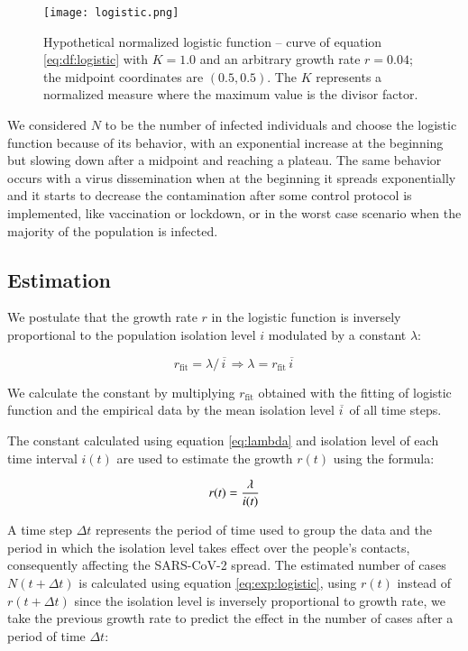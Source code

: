 \documentclass[review]{elsarticle}
\begin{document}
\begin{figure}
\centering
\texttt{[image: logistic.png]}
\caption{Hypothetical normalized logistic function -- 
curve of equation \ref{eq:df:logistic} with 
$K=1.0$ and an arbitrary growth rate $r=0.04$; 
the midpoint coordinates are $(0.5, 0.5)$.
The $K$ represents a normalized measure where 
the maximum value is the divisor factor.}
\label{fig:logistic}
\end{figure}

We considered $N$ to be the number of infected individuals 
and choose the logistic function because of its behavior, 
with an exponential increase at the beginning but slowing down after 
a  midpoint and reaching a plateau. 
The same behavior occurs with a virus dissemination when at the 
beginning it spreads exponentially and it starts to 
decrease the contamination after some control protocol is implemented, 
like vaccination or lockdown, 
or in the worst case scenario when the majority of the population is infected.

\subsection{Estimation}

We postulate that the growth rate $r$ in the logistic function is 
inversely proportional to the population isolation level $i$ 
modulated by a constant $\lambda$:

\begin{equation}
r_{\text{fit}} = {\lambda /\, \overline{i\,}} \Rightarrow \lambda = r_{\text{fit}}\, \overline{i\,}
\label{eq:lambda}
\end{equation}

We calculate the constant by multiplying $r_{\text{fit}}$ 
obtained with the fitting of 
logistic function and the empirical data by 
the mean isolation level $\overline{i\,}$  
of all time steps.

The constant calculated using equation \ref{eq:lambda} 
and isolation level of each time interval $i(t)$ 
are used to estimate the growth $r(t)$ using the formula:

\begin{equation}
r(t) = {\lambda\over i(t)}
\label{eq:rt}
\end{equation}

A time step $\Delta t$ represents the period of time used to group the data 
and the period in which the isolation level takes effect over
 the people's contacts, consequently affecting the SARS-CoV-2 spread. 
The estimated number of cases $N(t+\Delta t)$ is calculated using
 equation \ref{eq:exp:logistic}, using $r(t)$ instead of $r(t+\Delta t)$ since 
the isolation level is inversely proportional to growth rate, we take
 the previous growth rate to predict the effect in the number of cases after a 
period of time $\Delta t$:
\end{document}
